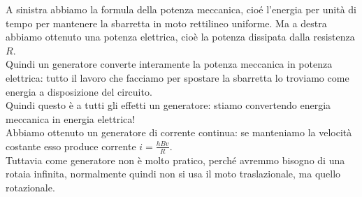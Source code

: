 A sinistra abbiamo la formula della potenza meccanica, cioé l'energia per unità di tempo per mantenere la sbarretta in moto rettilineo uniforme. Ma a destra abbiamo ottenuto una potenza elettrica, cioè la potenza dissipata dalla resistenza $R$.\\
Quindi un generatore converte interamente la potenza meccanica in potenza elettrica: tutto il lavoro che facciamo per spostare la sbarretta lo troviamo come energia a disposizione del circuito.\\
Quindi questo è a tutti gli effetti un generatore: stiamo convertendo energia meccanica in energia elettrica!\\
Abbiamo ottenuto un generatore di corrente continua: se manteniamo la velocità costante esso produce corrente $i=\frac{hBv}{R}$.\\

Tuttavia come generatore non è molto pratico, perché avremmo bisogno di una rotaia infinita, normalmente quindi non si usa il moto traslazionale, ma quello rotazionale.

